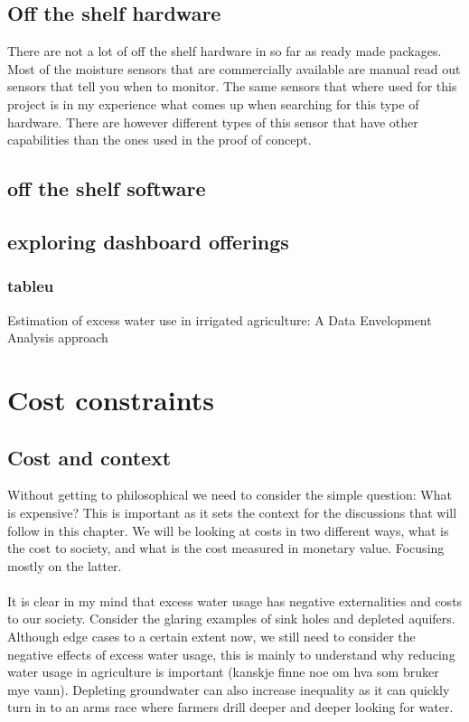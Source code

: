 \documentclass[]{uiophd}
\begin{document}
\section{Off the shelf hardware}
There are not a lot of off the shelf hardware in so far as ready made packages. Most of the moisture sensors that are commercially available are manual read out sensors that tell you when to monitor. The same sensors that where used for this project is in my experience what comes up when searching for this type of hardware. There are however different types of this sensor that have other capabilities than the ones used in the proof of concept. 
\section{off the shelf software}

\section{exploring dashboard offerings}
\subsection{tableu}

Estimation of excess water use in irrigated agriculture: A Data Envelopment Analysis approach

\chapter{Cost constraints}
\section{Cost and context}
Without getting to philosophical we need to consider the simple question: What is expensive? This is important as it sets the context for the discussions that will follow in this chapter. We will be looking at costs in two different ways, what is the cost to society, and what is the cost measured in monetary value. Focusing mostly on the latter. 
\\\\
It is clear in my mind that excess water usage has negative externalities and costs to our society. Consider the glaring examples of sink holes and depleted aquifers. Although edge cases to a certain extent now, we still need to consider the negative effects of excess water usage, this is mainly to understand why reducing water usage in agriculture is important (kanskje finne noe om hva som bruker mye vann). Depleting groundwater can also increase inequality as it can quickly turn in to an arms race where farmers drill deeper and deeper looking for water.
\end{document}
